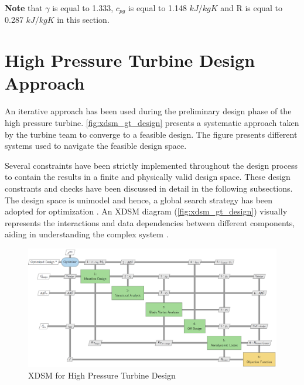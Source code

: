 \documentclass[12pt, letter]{report}
\begin{document}
\vspace{10pt}
\noindent \textbf{Note} that $\gamma$ is equal to 1.333, $c_{pg}$ is equal to 1.148 $kJ/{kg K}$ and R is equal to 0.287 $kJ/{kg K}$ in this section.\par





\section{High Pressure Turbine Design Approach}

An iterative approach has been used during the preliminary design phase of the high pressure turbine. \autoref{fig:xdsm_gt_design} presents a systematic approach taken by the turbine team to converge to a feasible design. The figure presents different systems used to navigate the feasible design space. \par 


Several constraints have been strictly implemented throughout the design process to contain the results in a finite and physically valid design space. These design constrants and checks have been discussed in detail in the following subsections. The design space is unimodel and hence, a global search strategy has been adopted for optimization \cite{mdobook}.
An XDSM diagram (\autoref{fig:xdsm_gt_design}) visually represents the interactions and data dependencies between different components, aiding in understanding the complex system \cite{mdobook}. 

\begin{figure}
    \centering
    \includegraphics[width=0.99\linewidth]{figures/gt_xdsm.png}
    \caption{XDSM for High Pressure Turbine Design}
    \label{fig:xdsm_gt_design}
\end{figure}
\end{document}
